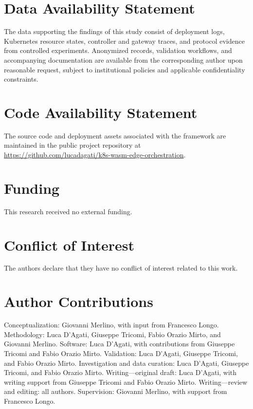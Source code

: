 \section*{Data Availability Statement}
The data supporting the findings of this study consist of deployment logs, Kubernetes resource states, controller and gateway traces, and protocol evidence from controlled experiments. Anonymized records, validation workflows, and accompanying documentation are available from the corresponding author upon reasonable request, subject to institutional policies and applicable confidentiality constraints.

\section*{Code Availability Statement}
The source code and deployment assets associated with the framework are maintained in the public project repository at \url{https://github.com/lucadagati/k8s-wasm-edge-orchestration}.

\section*{Funding}
This research received no external funding.

\section*{Conflict of Interest}
The authors declare that they have no conflict of interest related to this work.

\section*{Author Contributions}
Conceptualization: Giovanni Merlino, with input from Francesco Longo. Methodology: Luca D'Agati, Giuseppe Tricomi, Fabio Orazio Mirto, and Giovanni Merlino. Software: Luca D'Agati, with contributions from Giuseppe Tricomi and Fabio Orazio Mirto. Validation: Luca D'Agati, Giuseppe Tricomi, and Fabio Orazio Mirto. Investigation and data curation: Luca D'Agati, Giuseppe Tricomi, and Fabio Orazio Mirto. Writing---original draft: Luca D'Agati, with writing support from Giuseppe Tricomi and Fabio Orazio Mirto. Writing---review and editing: all authors. Supervision: Giovanni Merlino, with support from Francesco Longo.
